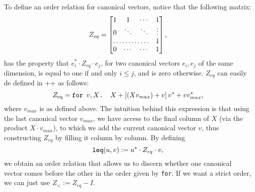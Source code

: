 To define an order relation for canonical vectors, notice that the following matrix:
\[
Z_{eq} = \begin{bmatrix}
    1 & 1 & \cdots &  1 \\
    0 & \ddots & \ddots & \vdots \\
    \hdotsfor{3} & 1 \\
    0 & \cdots & \cdots & 1 
\end{bmatrix},
\] 
has the property that $e_i^*\cdot Z_{eq} \cdot e_j$, for two canonical vectors $e_i,e_j$ of the same dimension, is equal to one if and only $i\leq j$, and is zero otherwise. $Z_{eq}$ can easily de defined in \lang++ as follows:
$$Z_{\text{eq}}=\texttt{for }v,X \texttt{. }X + \left[ (Xv_{max}) + v \right]v^* + vv^*_{max},$$
where $v_{max}$ is as defined above. The intuition behind this expression is that using the last canonical vector $v_{max}$, we have access to the final column of $X$ (via the product $X\cdot v_{max}$), to which we add the current canonical vector $v$, thus constructing $Z_{eq}$ by filling it column by column. By defining $$\texttt{leq}(u,v) := u^*\cdot Z_{eq} \cdot v,$$
we obtain an order relation that allows us to discern whether one canonical vector comes before the other in the order given by \texttt{for}. If we want a strict order, we can just use $Z_< := Z_{eq} - I$.

